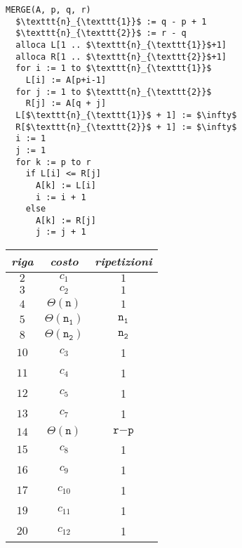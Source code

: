\documentclass[italian, 10pt]{article}
\begin{document}
\begin{minipage}[t]{0.495\textwidth}
  \begin{lstlisting}[style=pseudocode, caption={Pseudocodice dell'algoritmo \texttt{MERGE}}, label={lst:pseudocodice-merge}]
MERGE(A, p, q, r)
  $\texttt{n}_{\texttt{1}}$ := q - p + 1
  $\texttt{n}_{\texttt{2}}$ := r - q
  alloca L[1 .. $\texttt{n}_{\texttt{1}}$+1]
  alloca R[1 .. $\texttt{n}_{\texttt{2}}$+1]
  for i := 1 to $\texttt{n}_{\texttt{1}}$
    L[i] := A[p+i-1]
  for j := 1 to $\texttt{n}_{\texttt{2}}$
    R[j] := A[q + j]
  L[$\texttt{n}_{\texttt{1}}$ + 1] := $\infty$
  R[$\texttt{n}_{\texttt{2}}$ + 1] := $\infty$
  i := 1
  j := 1
  for k := p to r
    if L[i] <= R[j]
      A[k] := L[i]
      i := i + 1
    else
      A[k] := R[j]
      j := j + 1
          \end{lstlisting}
\end{minipage}
\begin{minipage}[t]{0.495\textwidth}
  \centering
  \begin{tabular}[t]{ccc}
    \textit{riga} & \textit{costo}                      & \textit{ripetizioni}        \\ \hline
    \(2\)         & \(c_1\)                             & \(1\)                       \\
    \(3\)         & \(c_2\)                             & \(1\)                       \\
    \(4\)         & \(\Theta(\texttt{n})\)              & \(1\)                       \\
    \(5\)         & \(\Theta(\texttt{n}_{\texttt{1}})\) & \(\texttt{n}_{\texttt{1}}\) \\
    \(8\)         & \(\Theta(\texttt{n}_{\texttt{2}})\) & \(\texttt{n}_{\texttt{2}}\) \\
    \(10\)        & \(c_3\)                             & 1                           \\
    \(11\)        & \(c_4\)                             & 1                           \\
    \(12\)        & \(c_5\)                             & 1                           \\
    \(13\)        & \(c_7\)                             & 1                           \\
    \(14\)        & \(\Theta(\texttt{n})\)              & \(\texttt{r} - \texttt{p}\) \\
    \(15\)        & \(c_8\)                             & 1                           \\
    \(16\)        & \(c_9\)                             & 1                           \\
    \(17\)        & \(c_{10}\)                          & 1                           \\
    \(19\)        & \(c_{11}\)                          & 1                           \\
    \(20\)        & \(c_{12}\)                          & 1                           \\
  \end{tabular}
\end{minipage}
\end{document}

